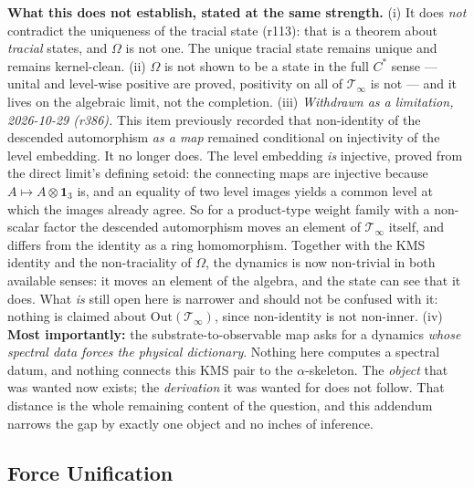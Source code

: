 \noindent \textbf{What this does not establish, stated at the same strength.}
(i) It does \emph{not} contradict the uniqueness of the tracial state
(r113): that is a theorem about \emph{tracial} states, and $\Omega$ is not
one. The unique tracial state remains unique and remains kernel-clean.
(ii) $\Omega$ is not shown to be a state in the full $C^*$ sense --- unital and
level-wise positive are proved, positivity on all of $\mathcal{T}_\infty$ is
not --- and it lives on the algebraic limit, not the completion.
(iii) \emph{Withdrawn as a limitation, 2026-10-29 (r386).} This item
previously recorded that non-identity of the descended automorphism \emph{as a
map} remained conditional on injectivity of the level embedding. It no longer
does. The level embedding \emph{is} injective, proved from the direct limit's
defining setoid: the connecting maps are injective because
$A \mapsto A \otimes \mathbf{1}_3$ is, and an equality of two level images
yields a common level at which the images already agree. So for a product-type
weight family with a non-scalar factor the descended automorphism moves an
element of $\mathcal{T}_\infty$ itself, and differs from the identity as a ring
homomorphism. Together with the KMS identity and the non-traciality of $\Omega$,
the dynamics is now non-trivial in both available senses: it moves an element of
the algebra, and the state can see that it does.
What \emph{is} still open here is narrower and should not be confused with it:
nothing is claimed about $\mathrm{Out}(\mathcal{T}_\infty)$, since
non-identity is not non-inner.
(iv) \textbf{Most importantly:} the substrate-to-observable map asks for a
dynamics \emph{whose spectral data forces the physical dictionary}. Nothing
here computes a spectral datum, and nothing connects this KMS pair to the
$\alpha$-skeleton. The \emph{object} that was wanted now exists; the
\emph{derivation} it was wanted for does not follow. That distance is the whole
remaining content of the question, and this addendum narrows the gap by exactly
one object and no inches of inference.

\subsection{Force Unification}

